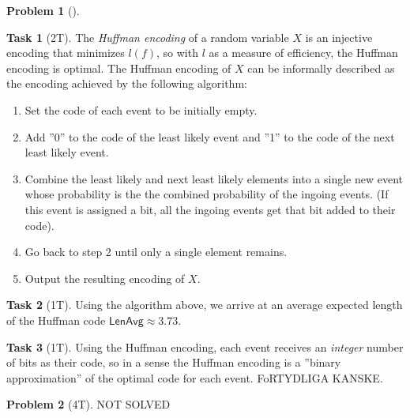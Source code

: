 \documentclass[11pt,twoside]{article}
\theoremstyle{definition}
\newtheorem{amsproblem}{Problem}
\newtheorem{amssubproblem}{Task}[amsproblem]
\newenvironment{problem}[1][]{%
  \begin{amsproblem}[#1]
  }{%
  \end{amsproblem}
}
\newenvironment{subproblem}[1][]{%
  \begin{amssubproblem}[#1]
  }{%
  \end{amssubproblem}
}
\newcommand{\TP}[1]{#1T}
\begin{document}
\begin{problem}
\begin{subproblem}[\TP{2}]
    The \emph{Huffman encoding} of a random variable $X$ is an injective encoding that minimizes $l(f)$, so with $l$ as a measure of efficiency, the Huffman encoding is optimal. The Huffman encoding of $X$ can be informally described as the encoding achieved by the following algorithm:
    \begin{enumerate}
      \item Set the code of each event to be initially empty.
      \item Add ''0'' to the code of the least likely event and ''1'' to the code of the next least likely event.
      \item Combine the least likely and next least likely elements into a single new event whose probability is the the combined probability of the ingoing events. (If this event is assigned a bit, all the ingoing events get that bit added to their code).
      \item Go back to step 2 until only a single element remains.
      \item Output the resulting encoding of $X$.
    \end{enumerate}
  \end{subproblem}
  \begin{subproblem}[\TP{1}]
    Using the algorithm above, we arrive at an average expected length of the Huffman code $\mathsf{LenAvg} \approx 3.73$.
  \end{subproblem}
  \begin{subproblem}[\TP{1}]
    Using the Huffman encoding, each event receives an \emph{integer} number of bits as their code, so in a sense the Huffman encoding is a ''binary approximation'' of the optimal code for each event. FoRTYDLIGA KANSKE.
  \end{subproblem}
\end{problem}

\noindent
\hrulefill

\begin{problem}[\TP{4}]
  NOT SOLVED %
\end{problem}

\noindent
\hrulefill
\end{document}
